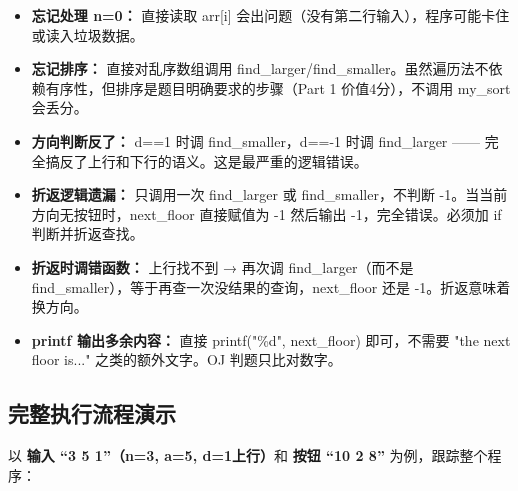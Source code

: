 \begin{itemize}
    \item \textbf{忘记处理 n=0：} 直接读取 arr[i] 会出问题（没有第二行输入），程序可能卡住或读入垃圾数据。
    \item \textbf{忘记排序：} 直接对乱序数组调用 find\_larger/find\_smaller。虽然遍历法不依赖有序性，但排序是题目明确要求的步骤（Part 1 价值4分），不调用 my\_sort 会丢分。
    \item \textbf{方向判断反了：} d==1 时调 find\_smaller，d==-1 时调 find\_larger —— 完全搞反了上行和下行的语义。这是最严重的逻辑错误。
    \item \textbf{折返逻辑遗漏：} 只调用一次 find\_larger 或 find\_smaller，不判断 -1。当当前方向无按钮时，next\_floor 直接赋值为 -1 然后输出 -1，完全错误。必须加 if 判断并折返查找。
    \item \textbf{折返时调错函数：} 上行找不到 → 再次调 find\_larger（而不是 find\_smaller），等于再查一次没结果的查询，next\_floor 还是 -1。折返意味着换方向。
    \item \textbf{printf 输出多余内容：} 直接 printf("\%d", next\_floor) 即可，不需要 "the next floor is..." 之类的额外文字。OJ 判题只比对数字。
\end{itemize}

\bigskip
\bigskip

\subsection{完整执行流程演示}

以 \textbf{输入 ``3 5 1''（n=3, a=5, d=1上行）}和 \textbf{按钮 ``10 2 8''} 为例，跟踪整个程序：

